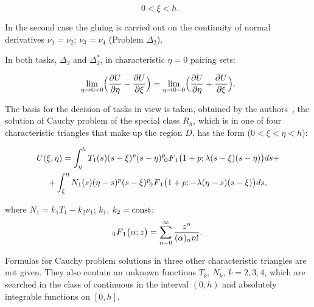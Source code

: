 $$ ~~ 0<\xi< h. $$



In the second case the gluing is carried out on the continuity of normal derivatives $\nu_1=\nu_2$; $\nu_3=\nu_4$ (Problem $\Delta_2$).

In both tasks, $\Delta_2$ and $\Delta_2^*$, in characteristic $\eta=0$ pairing sets:

$$ 

\lim_{\eta \to 0 + 0} \Bigl(\frac{\partial U}{\partial \eta} -  \frac{\partial U}{\partial \xi}\Bigr) = 

\lim_{\eta \to 0 - 0} \Bigl(\frac{\partial U}{\partial \eta} +  \frac{\partial U}{\partial \xi}\Bigr).

$$



The basis for the decision of tasks in view is taken, obtained by the authors~\cite{dolg:9, dolg:10, dolg:11}, the solution of Cauchy problem of the special class $R_h$, which is in one of four characteristic triangles that make up the region $D$, has the form ($0<\xi<\eta<h$):

\begin{multline}

U(\xi, \eta) = \int _\eta^h T_1(s) (s-\xi)^p (s-\eta)^p   \,\,

F_{\hspace{-4mm}0 \hspace{3mm}1} \bigl(1+p; \lambda (s-\xi) (s-\eta)\bigr) ds + 

\\

 + \int^\eta_\xi N_1(s) (\eta-s)^p (s-\xi)^p   \,\,

F_{\hspace{-4mm}0 \hspace{3mm}1} \bigl(1+p; - \lambda (\eta-s) (s-\xi)\bigr) ds, 

\end{multline}

where $N_1= k_1T_1 - k_2 \nu_1$; $k_1$, $k_2 = \rm const$; $$\,\,

F_{\hspace{-4mm}0 \hspace{3mm}1} \bigl(\alpha; z\bigr)= \sum_{n=0}^\infty \frac{z^n}{(\alpha)_n n!}.$$ 



Formulas for Cauchy problem solutions in three other characteristic triangles are not given. They also contain an unknown functions $T_k$, $N_k$, $k= 2, 3, 4$, which are searched in the class of continuous in the interval $(0, h)$ and absolutely integrable functions on $[0, h]$. 




